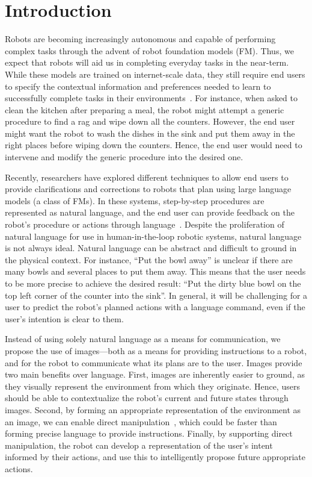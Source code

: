\section{Introduction}
Robots are becoming increasingly autonomous and capable of performing complex tasks through the advent of robot foundation models (FM). Thus, we expect that robots will aid us in completing everyday tasks in the near-term. While these models are trained on internet-scale data, they still require end users to specify the contextual information and preferences needed to learn to successfully complete tasks in their environments~\cite{ajaykumar2021survey}. For instance, when asked to clean the kitchen after preparing a meal, the robot might attempt a generic procedure to find a rag and wipe down all the counters. However, the end user might want the robot to wash the dishes in the sink and put them away in the right places before wiping down the counters. Hence, the end user would need to intervene and modify the generic procedure into the desired one.

Recently, researchers have explored different techniques to allow end users to provide clarifications and corrections to robots that plan using large language models (a class of FMs). In these systems, step-by-step procedures are represented as natural language, and the end user can provide feedback on the robot's procedure or actions through language~\cite{zha2023distilling, mahadevan2024generative}. Despite the proliferation of natural language for use in human-in-the-loop robotic systems, natural language is not always ideal. Natural language can be abstract and difficult to ground in the physical context. For instance, ``Put the bowl away'' is unclear if there are many bowls and several places to put them away. This means that the user needs to be more precise to achieve the desired result: ``Put the dirty blue bowl on the top left corner of the counter into the sink''. In general, it will be challenging for a user to predict the robot's planned actions with a language command, even if the user's intention is clear to them.

Instead of using solely natural language as a means for communication, we propose the use of images---both as a means for providing instructions to a robot, and for the robot to communicate what its plans are to the user. Images provide two main benefits over language. First, images are inherently easier to ground, as they visually represent the environment from which they originate. Hence, users should be able to contextualize the robot's current and future states through images. Second, by forming an appropriate representation of the environment as an image, we can enable direct manipulation~\cite{shneiderman1983direct}, which could be faster than forming precise language to provide instructions. Finally, by supporting direct manipulation, the robot can develop a representation of the user's intent informed by their actions, and use this to intelligently propose future appropriate actions.

